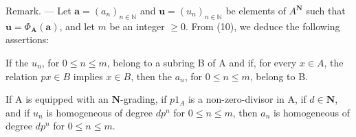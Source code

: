 Remark. — Let \(\boldsymbol{a} = (a_n)_{n \in \mathbb{N}}\) and \(\boldsymbol{u} = (u_n)_{n \in \mathbb{N}}\) be elements of \(A^{\mathbf{N}}\) such that \(\boldsymbol{u} = \Phi_{\mathbf{A}}(\boldsymbol{a})\), and let \(m\) be an integer \(\geqslant 0\). From (10), we deduce the following assertions:

If the \(u_n\), for \(0 \leqslant n \leqslant m\), belong to a subring B of A and if, for every \(x \in A\), the relation \(px \in B\) implies \(x \in B\), then the \(a_n\), for \(0 \leqslant n \leqslant m\), belong to B.

If A is equipped with an \(\mathbf{N}\)-grading, if \(p1_{A}\) is a non-zero-divisor in A, if \(d \in \mathbf{N}\), and if \(u_{n}\) is homogeneous of degree \(dp^{n}\) for \(0 \leqslant n \leqslant m\), then \(a_{n}\) is homogeneous of degree \(dp^{n}\) for \(0 \leqslant n \leqslant m\).

